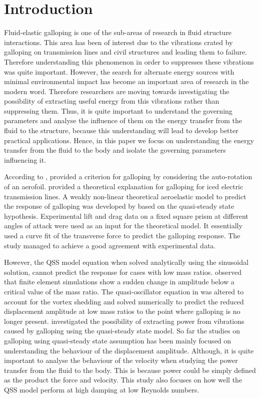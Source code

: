 \section{Introduction} 

Fluid-elastic galloping is one of the sub-areas of research in fluid structure interactions. This area has been of interest due to the vibrations crated by galloping on transmission lines and civil structures and leading them to failure. Therefore understanding this phenomenon in order to suppresses these vibrations was quite important. However, the search for alternate energy sources with minimal environmental impact has become an important area of research in the modern word. Therefore researchers are moving towards investigating the possibility of extracting useful energy from this vibrations rather than suppressing them. Thus, it is quite important to understand the governing parameters and analyse the influence of them on the energy transfer from the fluid to the structure, because this understanding will lead to develop better practical applications. Hence, in this paper we focus on understanding the energy transfer from the fluid to the body and isolate the governing parameters influencing it.

According to \citet{Paidoussis2010}, \citet{Glauert1919} provided a criterion for galloping by considering the auto-rotation of an aerofoil.  \citet{DenHartog1956} provided a theoretical explanation for galloping for iced electric transmission lines. A weakly non-linear theoretical aeroelastic model to predict the response of galloping was developed by \citet{Parkinson1964} based on the quasi-steady state hypothesis. Experimental lift and drag data on a fixed square prism at different angles of attack were used as an input for the theoretical model. It essentially used a curve fit of the transverse force to predict the galloping response. The study managed to achieve a good agreement with experimental data.

However, the QSS model equation when solved analytically using the sinusoidal solution, cannot predict the response for cases with low mass ratios. \citet{Joly2012} observed that finite element simulations show a sudden change in amplitude below a critical value of the mass ratio. The quasi-oscillator equation in \citet{Parkinson1964} was altered to account for the vortex shedding and solved numerically to predict the reduced displacement amplitude at low mass ratios to the point where galloping is no longer present. \citet{Barrero-Gil2010a} investigated the possibility of extracting power from vibrations caused by galloping using the quasi-steady state model. So far the studies on galloping using quasi-steady state assumption has been mainly focused on understanding the behaviour of the displacement amplitude. Although, it is quite important to analyse the behaviour of the velocity when studying the power transfer from the fluid to the body. This is because power could be simply defined as the product the force and velocity. This study also focuses on how well the QSS model perform at high damping at low Reynolds numbers. 


